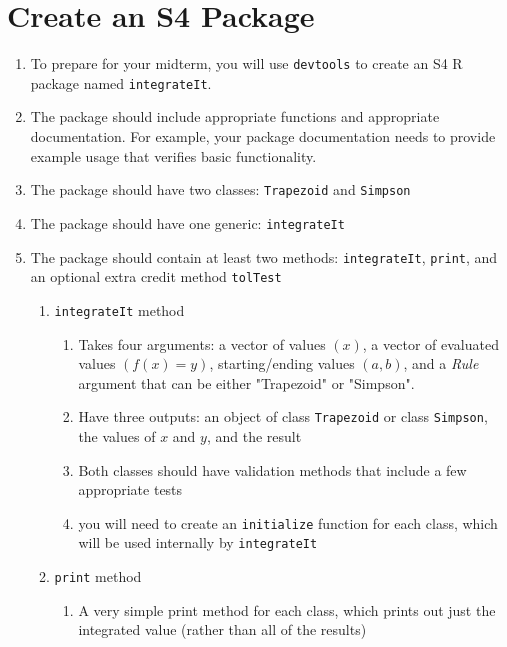 \documentclass[
]{article}
\begin{document}
\section*{Create an S4 Package}
\begin{enumerate}
\item To prepare for your midterm, you will use \texttt{devtools} to create an S4 R package named \texttt{integrateIt}.

\item The package should include appropriate functions and appropriate documentation. For example, your package documentation needs to provide example usage that verifies basic functionality.

\item The package should have two classes: \texttt{Trapezoid} and \texttt{Simpson}

\item The package should have one generic: \texttt{integrateIt}

\item The package should contain at least two methods: \texttt{integrateIt}, \texttt{print}, and an optional extra credit method \texttt{tolTest}
\begin{enumerate}
\item \texttt{integrateIt} method 
\begin{enumerate}
\item Takes four arguments: a vector of values $(x)$, a vector of evaluated values $(f(x)=y)$, starting/ending values $(a,b)$, and a \textit{Rule} argument that can be either "Trapezoid" or "Simpson".
\item Have three outputs: an object of class \texttt{Trapezoid} or class \texttt{Simpson}, the values of $x$ and $y$, and the result
\item Both classes should have validation methods that include a few appropriate tests
\item you will need to create an \texttt{initialize} function for each class, which will be used internally by \texttt{integrateIt}
\end{enumerate}



\item \texttt{print} method 
\begin{enumerate}
\item A very simple print method for each class, which prints out just the integrated value (rather than all of the results)
\end{enumerate}


\end{enumerate}
\end{enumerate}
\end{document}

